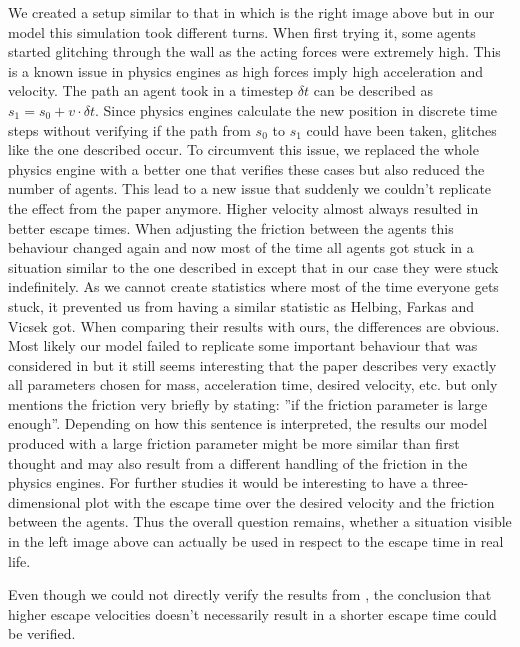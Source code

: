 \documentclass[11pt]{article}
\begin{document}
We created a setup similar to that in \cite{Helbing} which is the right image above but in our model this simulation took different turns. When first trying it, some agents started glitching through the wall as the acting forces were extremely high. This is a known issue in physics engines as high forces imply high acceleration and velocity. The path an agent took in a timestep $\delta t$ can be described as $s_1 = s_0 + v\cdot \delta t$.  Since physics engines calculate the new position in discrete time steps without verifying if the path from $s_0$ to $s_1$ could have been taken, glitches like the one described occur. To circumvent this issue, we replaced the whole physics engine with a better one that verifies these cases but also reduced the number of agents. This lead to a new issue that suddenly we couldn't replicate the effect from the paper anymore. Higher velocity almost always resulted in better escape times. When adjusting the friction between the agents this behaviour changed again and now most of the time all agents got stuck in a situation similar to the one described in \cite{Helbing} except that in our case they were stuck indefinitely. As we cannot create statistics where most of the time everyone gets stuck, it prevented us from having a similar statistic as Helbing, Farkas and Vicsek got. When comparing their results with ours, the differences are obvious. Most likely our model failed to replicate some important behaviour that was considered in \cite{Helbing} but it still seems interesting that the paper describes very exactly all parameters chosen for mass, acceleration time, desired velocity, etc. but only mentions the friction very briefly by stating: ''if the friction parameter is large enough''\cite{Helbing}. Depending on how this sentence is interpreted, the results our model produced with a large friction parameter might be more similar than first thought and may also result from a different handling of the friction in the physics engines. For further studies it would be interesting to have a three-dimensional plot with the escape time over the desired velocity and the friction between the agents. Thus the overall question remains, whether a situation visible in the left image above can actually be used in respect to the escape time in real life.

Even though we could not directly verify the results from \cite{Helbing}, the conclusion that higher escape velocities doesn't necessarily result in a shorter escape time could be verified.
\end{document}
